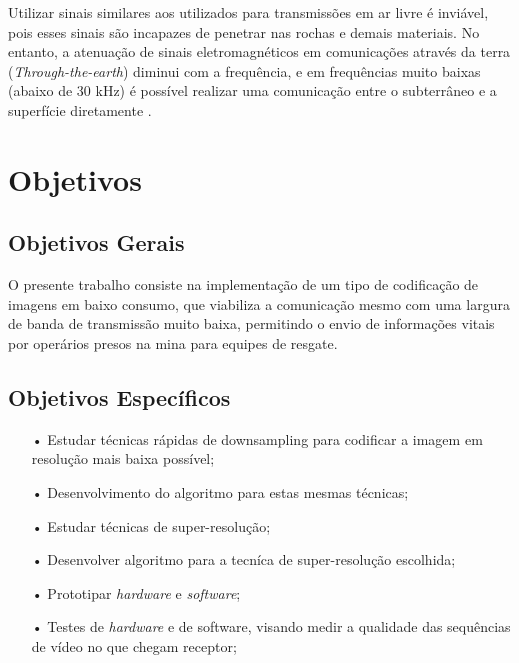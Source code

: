 Utilizar sinais similares aos utilizados para transmissões em ar livre é inviável, pois esses sinais são incapazes de penetrar nas rochas e demais materiais. No entanto, a atenuação de sinais eletromagnéticos em comunicações através da terra (\textit{Through-the-earth}) diminui com a frequência, e em frequências muito baixas (abaixo de 30 kHz) é possível realizar uma comunicação entre o subterrâneo e a superfície diretamente \cite{bandyopadhyay2010wireless}.

\section{Objetivos}
\label{OBJETIVOS}
\subsection{Objetivos Gerais}

	O presente trabalho consiste na implementação de um tipo de codificação de imagens em baixo consumo, que viabiliza a comunicação mesmo com uma largura de banda de transmissão muito baixa, permitindo o envio de informações vitais por operários presos na mina para equipes de resgate.


\subsection{Objetivos Específicos}
\begin{itemize}
\item[•]Estudar técnicas rápidas de downsampling para codificar a imagem em resolução mais baixa possível;
\item[•]Desenvolvimento do algoritmo para estas mesmas técnicas;
\item[•]Estudar técnicas de super-resolução;
\item[•]Desenvolver algoritmo para a tecníca de super-resolução escolhida;
\item[•]Prototipar \textit{hardware} e \textit{software};
\item[•]Testes de \textit{hardware} e de {software}, visando medir a qualidade das sequências de vídeo no que chegam receptor;
\end{itemize}